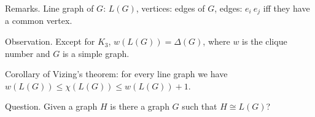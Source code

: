 \documentclass[12pt,a4paper]{article}
\begin{document}
Remarks.  Line graph of \(G\): \(L(G)\), vertices: edges of \(G\), edges: \(e_i
~ e_j\) iff they have a common vertex.

Observation.  Except for \(K_3\), \(w(L(G)) = \Delta(G)\), where \(w\) is the
clique number and \(G\) is a simple graph.

Corollary of Vizing's theorem: for every line graph we have \(w(L(G)) \leq
\chi(L(G)) \leq w(L(G)) + 1\).

Question. Given a graph \(H\) is there a graph \(G\) such that \(H \cong L(G)\)?
\end{document}
